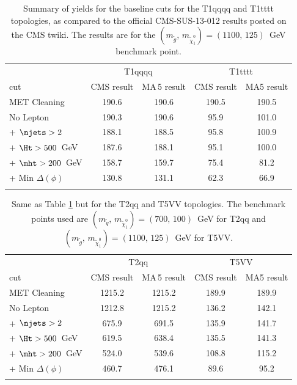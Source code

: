 \begin{table}[!t]
\caption{Summary of yields for the baseline cuts for the T1qqqq and T1tttt topologies, as compared to the official CMS-SUS-13-012 results posted on the CMS twiki. The results are for the $(m_{\tilde g},\,m_{\tilde\chi^0_1})=(1100,\,125)$~GeV benchmark point.\label{table:CutFlowT1qqqq}}
\begin{center}
\begin{tabular}{ l ||c|c||c|c}
\hline\noalign{\smallskip}
& \multicolumn{2}{|c||}{T1qqqq} & \multicolumn{2}{c}{T1tttt}  \\
cut & CMS result & {\sc MA}\,5 result & CMS result & {\sc MA}5 result \\ 
\hline\noalign{\smallskip}
MET Cleaning & 190.6 & 190.6 & 190.5  & 190.5    \\ 
No Lepton   & 190.3 & 190.6  &  95.9 & 101.0 \\
+ $\njets>2$        & 188.1 & 188.5  & 95.8 & 100.9  \\
+ $\Ht > 500$~GeV   & 187.6 & 188.1  & 95.1  &  100.0\\
+ $\mht >200$~GeV   &158.7  &  159.7 & 75.4 & 81.2  \\
+ Min $\Delta(\phi)$ & 130.8 & 131.1 &62.3 & 66.9 \\
\noalign{\smallskip}\hline
\end{tabular}
\end{center}
\end{table}

\begin{table}[!t]
\caption{Same as Table \ref{table:CutFlowT1qqqq}  but for the T2qq and T5VV topologies. 
The benchmark points used are $(m_{\tilde q},\,m_{\tilde\chi^0_1})=(700,\,100)$~GeV for T2qq and $(m_{\tilde g},\,m_{\tilde\chi^0_1})=(1100,\,125)$~GeV for T5VV.
\label{table:CutFlowT5VV}}
\begin{center}
\begin{tabular}{ l ||c|c||c|c}
\hline\noalign{\smallskip}
& \multicolumn{2}{|c||}{T2qq} & \multicolumn{2}{c}{T5VV}  \\
cut & CMS result & {\sc MA}\,5 result & CMS result & {\sc MA}5 result \\ 
\hline\noalign{\smallskip}
MET Cleaning & 1215.2 & 1215.2 &  189.9 & 189.9     \\ 
No Lepton   & 1212.8 & 1215.2  & 136.2  & 142.1  \\
+ $\njets>2$        & 675.9 & 691.5  &135.9  & 141.7  \\
+ $\Ht > 500$~GeV   & 619.5 & 638.4   & 135.5  & 141.3 \\
+ $\mht >200$~GeV   & 524.0 & 539.6   & 108.8 & 115.2   \\
+ Min $\Delta(\phi)$ & 460.7 & 476.1  & 89.6 & 95.2 \\
\noalign{\smallskip}\hline
\end{tabular}
\end{center}
\end{table}

